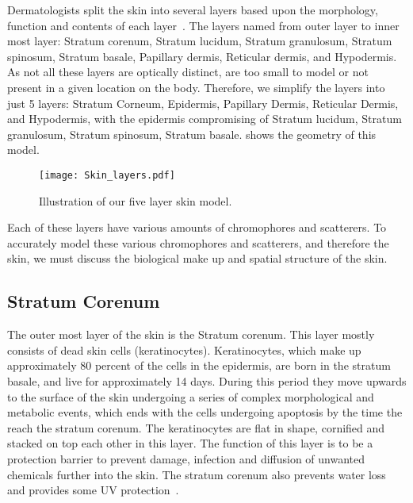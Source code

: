 Dermatologists split the skin into several layers based upon the morphology, function and contents of each layer~\cite{freedberg1999fitzpatrick,zaidi2010dermatology}.
The layers named from outer layer to inner most layer: Stratum corenum, Stratum lucidum, Stratum granulosum, Stratum spinosum, Stratum basale, Papillary dermis, Reticular dermis, and Hypodermis.
As not all these layers are optically distinct, are too small to model or not present in a given location on the body.
Therefore, we simplify the layers into just 5 layers: Stratum Corneum, Epidermis, Papillary Dermis, Reticular Dermis, and Hypodermis, with the epidermis compromising of Stratum lucidum, Stratum granulosum, Stratum spinosum, Stratum basale. shows the geometry of this model.

\begin{figure}[!htpb]
    \centering
    \texttt{[image: Skin\_layers.pdf]}
    \caption{Illustration of our five layer skin model.}
    \label{fig:skinexample}
\end{figure}

Each of these layers have various amounts of chromophores and scatterers.
To accurately model these various chromophores and scatterers, and therefore the skin, we must discuss the biological make up and spatial structure of the skin.

\subsection*{Stratum Corenum} %
\label{sub:stratum}

The outer most layer of the skin is the Stratum corenum.
This layer mostly consists of dead skin cells (keratinocytes).
Keratinocytes, which make up approximately 80 percent of the cells in the epidermis, are born in the stratum basale, and live for approximately 14 days.
During this period they move upwards to the surface of the skin undergoing a series of complex morphological and metabolic events, which ends with the cells undergoing apoptosis by the time the reach the stratum corenum.
The keratinocytes are flat in shape, cornified and stacked on top each other in this layer.
The function of this layer is to be a protection barrier to prevent damage, infection and diffusion of unwanted chemicals further into the skin.
The stratum corenum also prevents water loss and provides some UV protection~\cite{freedberg1999fitzpatrick,zaidi2010dermatology}.


